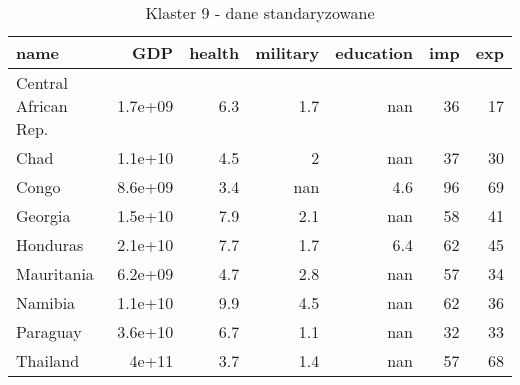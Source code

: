 \begin{table}
    \centering
    \caption{Klaster 9 - dane standaryzowane}
    \label{tab:cl9std}
    \begin{tabular}{lrrrrrr}
        \toprule
        name                 & GDP     & health & military & education & imp & exp \\
        \midrule
        Central African Rep. & 1.7e+09 & 6.3    & 1.7      & nan       & 36  & 17  \\
        Chad                 & 1.1e+10 & 4.5    & 2        & nan       & 37  & 30  \\
        Congo                & 8.6e+09 & 3.4    & nan      & 4.6       & 96  & 69  \\
        Georgia              & 1.5e+10 & 7.9    & 2.1      & nan       & 58  & 41  \\
        Honduras             & 2.1e+10 & 7.7    & 1.7      & 6.4       & 62  & 45  \\
        Mauritania           & 6.2e+09 & 4.7    & 2.8      & nan       & 57  & 34  \\
        Namibia              & 1.1e+10 & 9.9    & 4.5      & nan       & 62  & 36  \\
        Paraguay             & 3.6e+10 & 6.7    & 1.1      & nan       & 32  & 33  \\
        Thailand             & 4e+11   & 3.7    & 1.4      & nan       & 57  & 68  \\
        \bottomrule
    \end{tabular}
\end{table}
